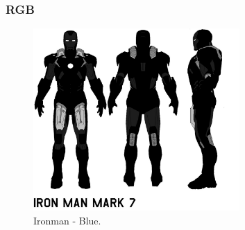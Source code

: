 \documentclass{beamer}
\begin{document}
\begin{frame}
\frametitle{RGB}
		
		\begin{figure}[!h]
			\begin{center}
				\includegraphics[width=0.7\textwidth]{Figures/Blue}
				\caption{Ironman - Blue.}
			\end{center}
		\end{figure}
	
\end{frame}
\end{document}

